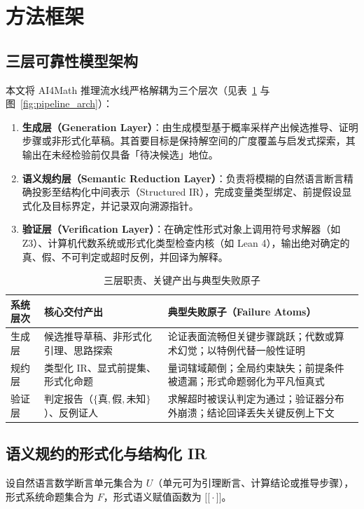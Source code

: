 ﻿\documentclass[UTF8,a4paper,11pt]{ctexart}
\theoremstyle{definition}
\providecommand{\llbracket}{\mathopen{[\![}}
\providecommand{\rrbracket}{\mathclose{]\!]}}
\begin{document}
\section{方法框架}
\label{sec:framework}

\subsection{三层可靠性模型架构}
本文将 AI4Math 推理流水线严格解耦为三个层次（见表~\ref{tab:layers} 与图~\ref{fig:pipeline_arch}）：
\begin{enumerate}[leftmargin=1.8em,itemsep=2pt]
  \item \textbf{生成层（Generation Layer）}：由生成模型基于概率采样产出候选推导、证明步骤或非形式化草稿。其首要目标是保持解空间的广度覆盖与启发式探索，其输出在未经检验前仅具备「待决候选」地位。
  \item \textbf{语义规约层（Semantic Reduction Layer）}：负责将模糊的自然语言断言精确投影至结构化中间表示（Structured IR），完成变量类型绑定、前提假设显式化及目标界定，并记录双向溯源指针。
  \item \textbf{验证层（Verification Layer）}：在确定性形式对象上调用符号求解器（如 Z3）、计算机代数系统或形式化类型检查内核（如 Lean 4），输出绝对确定的真、假、不可判定或超时反例，并回译为解释。
\end{enumerate}

\begin{table}[htbp]
\centering
\small
\caption{三层职责、关键产出与典型失败原子}
\label{tab:layers}
\begin{tabular}{p{1.8cm}p{4.6cm}p{7.2cm}}
\toprule
系统层次 & 核心交付产出 & 典型失败原子（Failure Atoms） \\
\midrule
生成层 & 候选推导草稿、非形式化引理、思路探索 & 论证表面流畅但关键步骤跳跃；代数或算术幻觉；以特例代替一般性证明 \\
规约层 & 类型化 IR、显式前提集、形式化命题 & 量词辖域颠倒；全局约束缺失；前提条件被遗漏；形式命题弱化为平凡恒真式 \\
验证层 & 判定报告（$\{\text{真}, \text{假}, \text{未知}\}$）、反例证人 & 求解超时被误认判定为通过；验证器分布外崩溃；结论回译丢失关键反例上下文 \\
\bottomrule
\end{tabular}
\end{table}

\subsection{语义规约的形式化与结构化 IR}
设自然语言数学断言单元集合为 $U$（单元可为引理断言、计算结论或推导步骤），形式系统命题集合为 $F$，形式语义赋值函数为 $\llbracket\cdot\rrbracket$。
\end{document}
